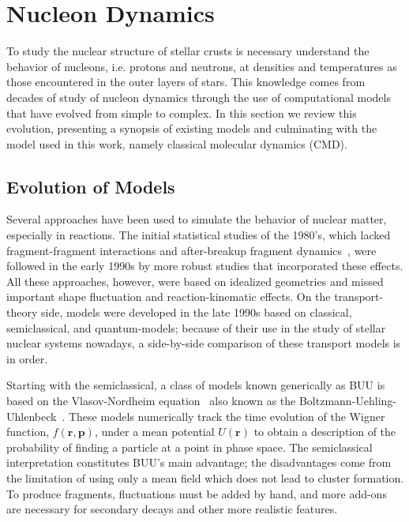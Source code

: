 \section{Nucleon Dynamics}\label{sc:nucleon}
To study the nuclear structure of stellar crusts is necessary
understand the behavior of nucleons, i.e. protons and neutrons, at
densities and temperatures as those encountered in the outer
layers of stars.  This knowledge comes from decades of study of
nucleon dynamics through the use of computational models that have
evolved from simple to complex.  In this section we review this
evolution, presenting a synopsis of existing models and culminating
with the model used in this work, namely classical molecular
dynamics (CMD).

\subsection{Evolution of Models}
Several approaches have been used to simulate the behavior of nuclear
matter, especially in reactions. The initial statistical studies of
the 1980's, which lacked fragment-fragment interactions and
after-breakup fragment dynamics~\cite{barz_cluster_1996}, were
followed in the early 1990s by more robust studies that incorporated
these effects.  All these approaches, however, were based on idealized
geometries and missed important shape fluctuation and
reaction-kinematic effects.  On the transport-theory side, models were
developed in the late 1990s based on classical, semiclassical, and
quantum-models; because of their use in the study of stellar nuclear
systems nowadays, a side-by-side comparison of these transport models
is in order.

Starting with the semiclassical, a class of models known generically
as BUU is based on the Vlasov-Nordheim
equation~\cite{nordheim_kinetic_1928} also known as the
Boltzmann-Uehling-Uhlenbeck~\cite{uehling_transport_1933}. These
models numerically track the time evolution of the Wigner function,
$f(\mathbf{r},\mathbf{p})$, under a mean potential $U(\mathbf{r})$ to
obtain a description of the probability of finding a particle at a
point in phase space. The semiclassical interpretation constitutes
BUU's main advantage; the disadvantages come from the limitation of
using only a mean field which does not lead to cluster formation. To
produce fragments, fluctuations must be added by hand, and more
add-ons are necessary for secondary decays and other more realistic
features.

